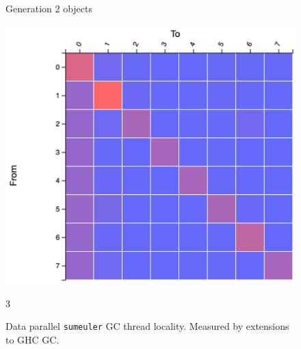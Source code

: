\documentclass{paper}\usepackage{graphicx}
\begin{document}
\begin{figure}[!htb]
\begin{multicols}{3}
    \caption{Generation 2 objects}
    \label{fig:dp_gen2}
    \includegraphics[width=\linewidth]{Paper/images/sumeuler/dp_gen2.png}\par
    \end{multicols}{3}
    \caption{Data parallel \lstinline{sumeuler} GC thread locality. Measured by extensions to GHC GC.}
    \label{fig:dp_static}
\end{figure}
\end{document}
